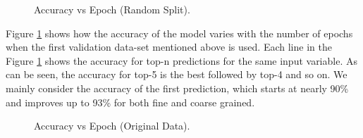 \begin{figure}[ht]
    \centering
    \caption[Accuracy vs Epoch (Random Split)]{\label{fig:lex_random}Accuracy vs Epoch (Random Split). }
\end{figure}

Figure \ref{fig:lex_random} shows how the accuracy of the model varies with the number of epochs when the first validation data-set mentioned above is used.
Each line in the Figure \ref{fig:lex_random} shows the accuracy for top-n predictions for the same input variable.
As can be seen, the accuracy for top-5 is the best followed by top-4 and so on.
We mainly consider the accuracy of the first prediction, which starts at nearly 90\% and improves up to 93\% for both fine and coarse grained.

\begin{figure}[ht]
    \centering
    \caption[Accuracy vs Epoch (Original Data)]{\label{fig:lex_original}Accuracy vs Epoch (Original Data). }
\end{figure}

